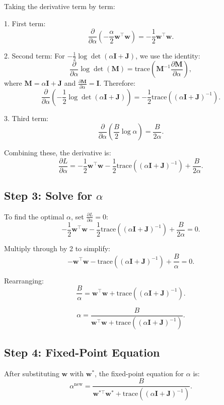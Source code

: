 \documentclass{article}
\begin{document}
Taking the derivative term by term:

1. First term:
\[
\frac{\partial}{\partial \alpha} \left( -\frac{\alpha}{2} \mathbf{w}^\top \mathbf{w} \right) = -\frac{1}{2} \mathbf{w}^\top \mathbf{w}.
\]

2. Second term: For \(-\frac{1}{2} \log \det (\alpha \mathbf{I} + \mathbf{J})\), we use the identity:
\[
\frac{\partial}{\partial \alpha} \log \det (\mathbf{M}) = \text{trace} \left( \mathbf{M}^{-1} \frac{\partial \mathbf{M}}{\partial \alpha} \right),
\]
where \(\mathbf{M} = \alpha \mathbf{I} + \mathbf{J}\) and \(\frac{\partial \mathbf{M}}{\partial \alpha} = \mathbf{I}\). Therefore:
\[
\frac{\partial}{\partial \alpha} \left( -\frac{1}{2} \log \det (\alpha \mathbf{I} + \mathbf{J}) \right) = -\frac{1}{2} \text{trace} \left( (\alpha \mathbf{I} + \mathbf{J})^{-1} \right).
\]

3. Third term:
\[
\frac{\partial}{\partial \alpha} \left( \frac{B}{2} \log \alpha \right) = \frac{B}{2\alpha}.
\]

Combining these, the derivative is:
\[
\frac{\partial L}{\partial \alpha} = -\frac{1}{2} \mathbf{w}^\top \mathbf{w} - \frac{1}{2} \text{trace}((\alpha \mathbf{I} + \mathbf{J})^{-1}) + \frac{B}{2\alpha}.
\]

\subsection*{Step 3: Solve for \(\alpha\)}

To find the optimal \(\alpha\), set \(\frac{\partial L}{\partial \alpha} = 0\):
\[
-\frac{1}{2} \mathbf{w}^\top \mathbf{w} - \frac{1}{2} \text{trace}((\alpha \mathbf{I} + \mathbf{J})^{-1}) + \frac{B}{2\alpha} = 0.
\]

Multiply through by 2 to simplify:
\[
-\mathbf{w}^\top \mathbf{w} - \text{trace}((\alpha \mathbf{I} + \mathbf{J})^{-1}) + \frac{B}{\alpha} = 0.
\]

Rearranging:
\[
\frac{B}{\alpha} = \mathbf{w}^\top \mathbf{w} + \text{trace}((\alpha \mathbf{I} + \mathbf{J})^{-1}).
\]

\[
\alpha = \frac{B}{\mathbf{w}^\top \mathbf{w} + \text{trace}((\alpha \mathbf{I} + \mathbf{J})^{-1})}.
\]

\subsection*{Step 4: Fixed-Point Equation}

After substituting $ \mathbf{w}$ with $ \mathbf{w}^*$, the fixed-point equation for \(\alpha\) is:
\[
\alpha^{\text{new}} = \frac{B}{\mathbf{w}^{*\top} \mathbf{w}^* + \text{trace}((\alpha \mathbf{I} + \mathbf{J})^{-1})}.
\]
\end{document}
